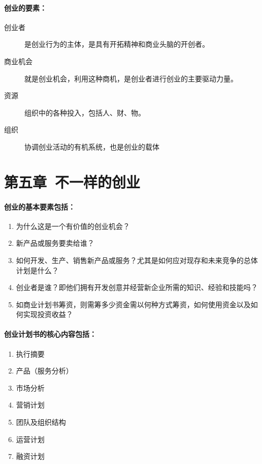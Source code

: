 \documentclass[UTF8]{article}
\begin{document}
\paragraph{创业的要素：}
\begin{description}
\item[创业者]是创业行为的主体，是具有开拓精神和商业头脑的开创者。
\item[商业机会]就是创业机会，利用这种商机，是创业者进行创业的主要驱动力量。
\item[资源]组织中的各种投入，包括人、财、物。
\item[组织]协调创业活动的有机系统，也是创业的载体
\end{description}

\section{第五章\ 不一样的创业}
\paragraph{创业的基本要素包括：}
\begin{enumerate}[1)]
\item 为什么这是一个有价值的创业机会？
\item 新产品或服务要卖给谁？
\item 如何开发、生产、销售新产品或服务？尤其是如何应对现存和未来竞争的总体计划是什么？
\item 创业者是谁？即他们拥有开发创意并经营新企业所需的知识、经验和技能吗？
\item 如商业计划书筹资，则需筹多少资金需以何种方式筹资，如何使用资金以及如何实现投资收益？
\end{enumerate}
\paragraph{创业计划书的核心内容包括：}
\begin{enumerate}[1)]
    \item 执行摘要
    \item 产品（服务分析）
    \item 市场分析
    \item 营销计划
    \item 团队及组织结构
    \item 运营计划
    \item 融资计划
\end{enumerate}
\end{document}
